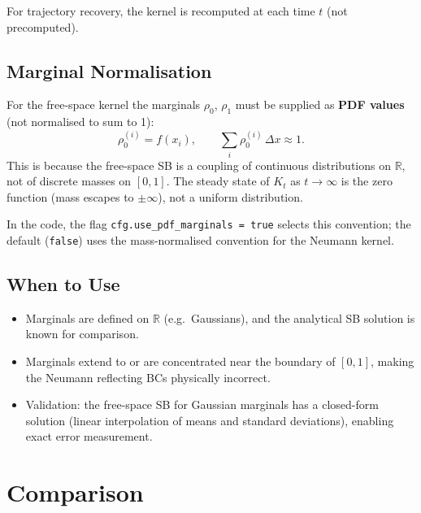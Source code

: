 \documentclass[11pt]{article}
\newcommand{\dx}{\Delta x}
\newcommand{\RR}{\mathbb{R}}
\theoremstyle{remark}
\begin{document}
For trajectory recovery, the kernel is recomputed at each time $t$ (not precomputed).

\subsection{Marginal Normalisation}

For the free-space kernel the marginals $\rho_0$, $\rho_1$ must be supplied as
\textbf{PDF values} (not normalised to sum to 1):
\begin{equation}
  \rho_0^{(i)} = f(x_i), \qquad \sum_i \rho_0^{(i)}\,\dx \approx 1.
\end{equation}
This is because the free-space SB is a coupling of continuous distributions on $\RR$,
not of discrete masses on $[0,1]$.
The steady state of $K_t$ as $t \to \infty$ is the zero function (mass escapes to
$\pm\infty$), not a uniform distribution.

In the code, the flag \texttt{cfg.use\_pdf\_marginals = true} selects this convention;
the default (\texttt{false}) uses the mass-normalised convention for the Neumann kernel.

\subsection{When to Use}

\begin{itemize}
  \item Marginals are defined on $\RR$ (e.g.\ Gaussians), and the analytical SB
        solution is known for comparison.
  \item Marginals extend to or are concentrated near the boundary of $[0,1]$, making
        the Neumann reflecting BCs physically incorrect.
  \item Validation: the free-space SB for Gaussian marginals has a closed-form solution
        (linear interpolation of means and standard deviations), enabling exact error measurement.
\end{itemize}

\section{Comparison}
\end{document}
